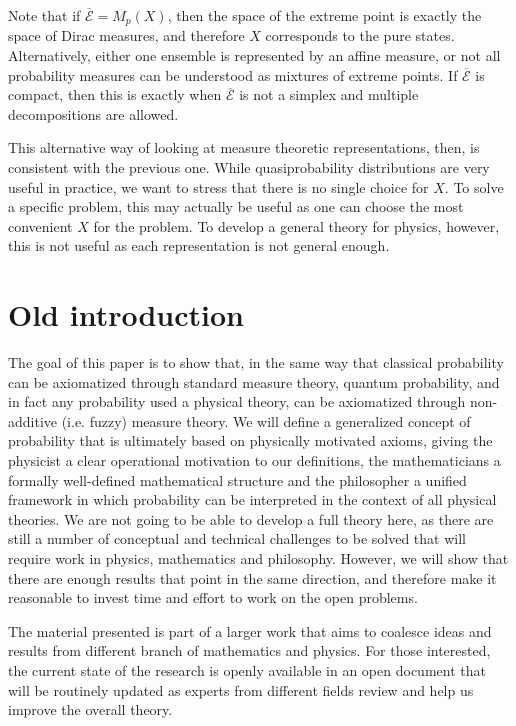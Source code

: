 \documentclass[10pt,twocolumn, nofootinbib]{revtex4-2}
\newcommand{\Ens}[1][E] {\mathcal{#1}} %
\begin{document}
Note that if $\overline{\Ens} = M_p(X)$, then the space of the extreme point is exactly the space of Dirac measures, and therefore $X$ corresponds to the pure states. Alternatively, either one ensemble is represented by an affine measure, or not all probability measures can be understood as mixtures of extreme points. If $\overline{\Ens}$ is compact, then this is exactly when $\overline{\Ens}$ is not a simplex and multiple decompositions are allowed.

This alternative way of looking at measure theoretic representations, then, is consistent with the previous one. While quasiprobability distributions are very useful in practice, we want to stress that there is no single choice for $X$. To solve a specific problem, this may actually be useful as one can choose the most convenient $X$ for the problem. To develop a general theory for physics, however, this is not useful as each representation is not general enough.

\section{Old introduction}

The goal of this paper is to show that, in the same way that classical probability can be axiomatized through standard measure theory, quantum probability, and in fact any probability used a physical theory, can be axiomatized through non-additive (i.e. fuzzy) measure theory. We will define a generalized concept of probability that is ultimately based on physically motivated axioms, giving the physicist a clear operational motivation to our definitions, the mathematicians a formally well-defined mathematical structure and the philosopher a unified framework in which probability can be interpreted in the context of all physical theories. We are not going to be able to develop a full theory here, as there are still a number of conceptual and technical challenges to be solved that will require work in physics, mathematics and philosophy. However, we will show that there are enough results that point in the same direction, and therefore make it reasonable to invest time and effort to work on the open problems.

The material presented is part of a larger work that aims to coalesce ideas and results from different branch of mathematics and physics. For those interested, the current state of the research is openly available in an open document that will be routinely updated as experts from different fields review and help us improve the overall theory.
\end{document}
